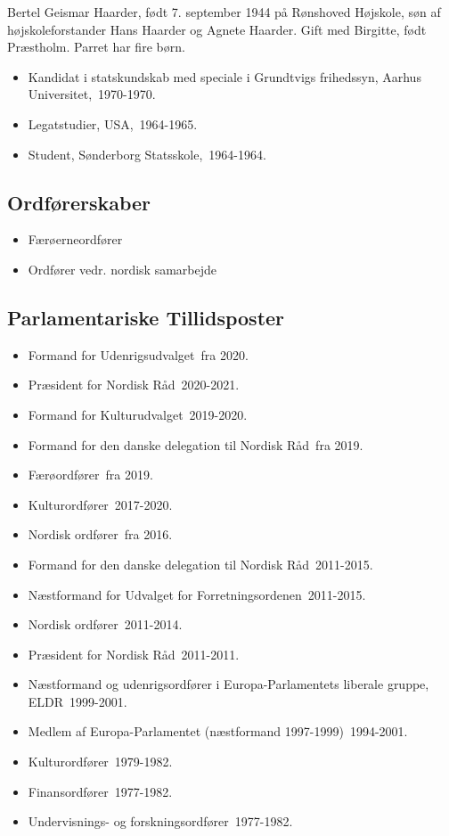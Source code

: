\documentclass[11pt, a4paper]{awesome-cv}
\begin{document}
\makecvheader[R]
\makelettertitle
\begin{cvletter}
Bertel Geismar Haarder, født 7. september 1944 på Rønshoved Højskole, søn af højskoleforstander Hans Haarder og Agnete Haarder. Gift med Birgitte, født Præstholm. Parret har fire børn.

\begin{itemize}
\item Kandidat i statskundskab med speciale i Grundtvigs frihedssyn, Aarhus Universitet, 1970-1970.
\item Legatstudier, USA, 1964-1965.
\item Student, Sønderborg Statsskole, 1964-1964.
\end{itemize}
\subsection*{Ordførerskaber}
\begin{itemize}
\item Færøerneordfører
\item Ordfører vedr. nordisk samarbejde
\end{itemize}
\subsection*{Parlamentariske Tillidsposter}
\begin{itemize}
\item Formand for Udenrigsudvalget fra 2020.
\item Præsident for Nordisk Råd 2020-2021.
\item Formand for Kulturudvalget 2019-2020.
\item Formand for den danske delegation til Nordisk Råd fra 2019.
\item Færøordfører fra 2019.
\item Kulturordfører 2017-2020.
\item Nordisk ordfører fra 2016.
\item Formand for den danske delegation til Nordisk Råd 2011-2015.
\item Næstformand for Udvalget for Forretningsordenen 2011-2015.
\item Nordisk ordfører 2011-2014.
\item Præsident for Nordisk Råd 2011-2011.
\item Næstformand og udenrigsordfører i Europa-Parlamentets liberale gruppe, ELDR 1999-2001.
\item Medlem af Europa-Parlamentet (næstformand 1997-1999) 1994-2001.
\item Kulturordfører 1979-1982.
\item Finansordfører 1977-1982.
\item Undervisnings- og forskningsordfører 1977-1982.
\end{itemize}

\end{cvletter}
\end{document}

